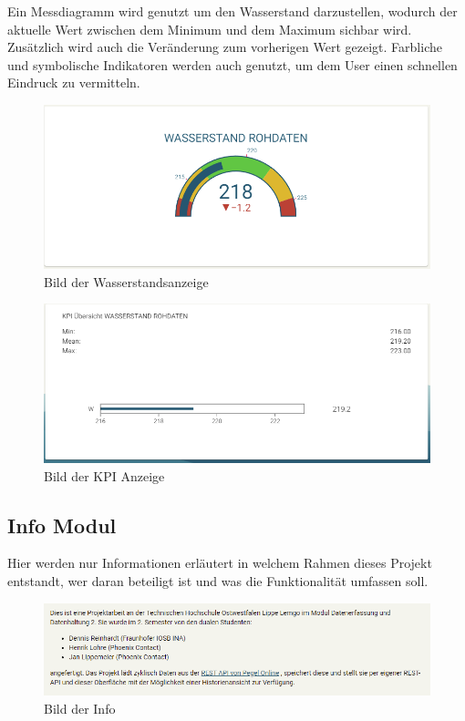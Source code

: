 Ein Messdiagramm wird genutzt um den Wasserstand darzustellen, wodurch der aktuelle Wert zwischen dem Minimum und dem Maximum sichbar wird. Zusätzlich wird auch die Veränderung zum vorherigen Wert gezeigt. Farbliche und symbolische Indikatoren werden auch genutzt, um dem User einen schnellen Eindruck zu vermitteln. 
\begin{figure}[!htb]
 \centering
 \includegraphics[width=13cm]{figures/OnlyGauge.PNG}
 \caption{Bild der Wasserstandsanzeige }
 \label{fig:Bild der Wasserstandsanzeige }
\end{figure}

\begin{figure}[!htb]
    \centering
    \includegraphics[width=13cm]{figures/KPI.PNG}
    \caption{Bild der KPI Anzeige}
    \label{fig:Bild der KPI Anzeige}
   \end{figure}

\newpage
\subsection{Info Modul}

Hier werden nur Informationen erläutert in welchem Rahmen dieses Projekt entstandt, wer daran beteiligt ist und was die Funktionalität umfassen soll.

\begin{figure}[!htb]
 \centering
 \includegraphics[width=15cm]{figures/Info.PNG}
 \caption{Bild der Info}
 \label{fig:Bild der Info}
\end{figure}

